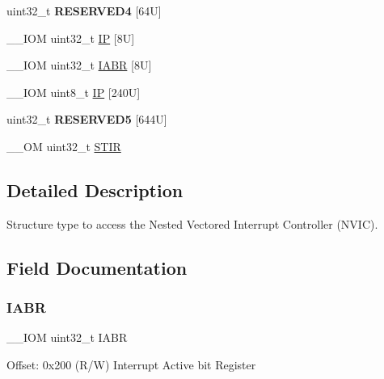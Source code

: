\begin{DoxyCompactItemize}
\item 
\mbox{\label{struct_n_v_i_c___type_aba051916995cac44d084f98e03710def}} 
uint32\+\_\+t {\bfseries R\+E\+S\+E\+R\+V\+E\+D4} \mbox{[}64\+U\mbox{]}
\item 
\+\_\+\+\_\+\+I\+OM uint32\+\_\+t \hyperlink{struct_n_v_i_c___type_a1787506107747d2dedae05295d3532da}{IP} \mbox{[}8\+U\mbox{]}
\item 
\+\_\+\+\_\+\+I\+OM uint32\+\_\+t \hyperlink{struct_n_v_i_c___type_a9dbbeff4da41df476f0718c3ce11ab89}{I\+A\+BR} \mbox{[}8\+U\mbox{]}
\item 
\+\_\+\+\_\+\+I\+OM uint8\+\_\+t \hyperlink{struct_n_v_i_c___type_a4fda947a8fd3237a89d43b7d5a1057cb}{IP} \mbox{[}240\+U\mbox{]}
\item 
\mbox{\label{struct_n_v_i_c___type_ab94befc6cb8470a5e871cf2c99cb7a6e}} 
uint32\+\_\+t {\bfseries R\+E\+S\+E\+R\+V\+E\+D5} \mbox{[}644\+U\mbox{]}
\item 
\+\_\+\+\_\+\+OM uint32\+\_\+t \hyperlink{struct_n_v_i_c___type_ada9cbba14ab1cc3fddd585f870932db8}{S\+T\+IR}
\end{DoxyCompactItemize}


\subsection{Detailed Description}
Structure type to access the Nested Vectored Interrupt Controller (N\+V\+IC). 

\subsection{Field Documentation}
\mbox{\label{struct_n_v_i_c___type_a9dbbeff4da41df476f0718c3ce11ab89}} 
\subsubsection{\texorpdfstring{I\+A\+BR}{IABR}}
{\footnotesize\ttfamily \+\_\+\+\_\+\+I\+OM uint32\+\_\+t I\+A\+BR}

Offset\+: 0x200 (R/W) Interrupt Active bit Register \mbox{\label{struct_n_v_i_c___type_a3617ee583e4154c0a5901c6965020da9}} 

